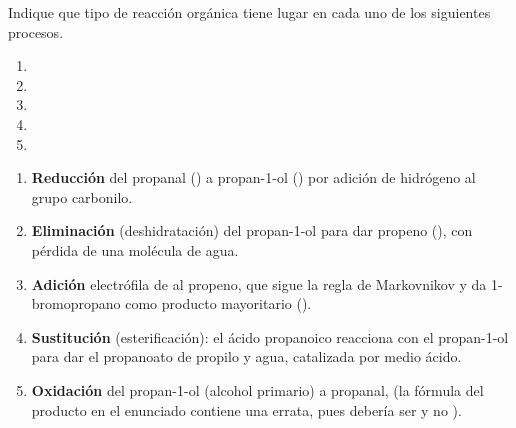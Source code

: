 \begin{exerciseEVAU}
    Indique que tipo de reacción orgánica tiene lugar en cada uno de los siguientes procesos.
    \begin{enumerate}[label=\letraminuscula]
        \item {}
        \item {}
        \item {}
        \item {}
        \item {}
    \end{enumerate}
    \begin{solu}
        \begin{enumerate}[label=\letraminuscula]
            \item \textbf{Reducción} del propanal () a propan-1-ol () por adición de hidrógeno al grupo carbonilo.

            \item \textbf{Eliminación} (deshidratación) del propan-1-ol para dar propeno (), con pérdida de una molécula de agua.

            \item \textbf{Adición} electrófila de  al propeno, que sigue la regla de Markovnikov y da 1-bromopropano como producto mayoritario ().

            \item \textbf{Sustitución} (esterificación): el ácido propanoico reacciona con el propan-1-ol para dar el propanoato de propilo y agua, catalizada por medio ácido.

            \item \textbf{Oxidación} del propan-1-ol (alcohol primario) a propanal,  (la fórmula del producto en el enunciado contiene una errata, pues debería ser  y no ).
        \end{enumerate}
    \end{solu}
\end{exerciseEVAU}


